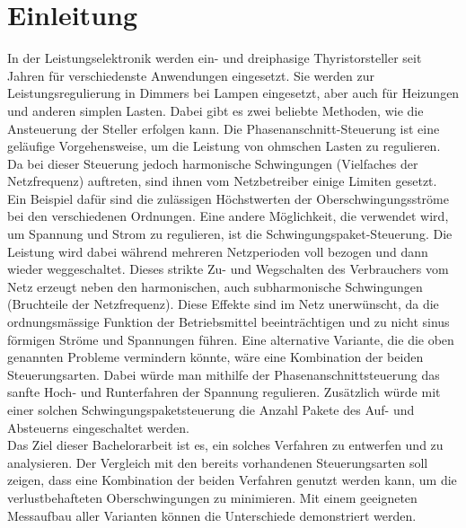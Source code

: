 \section{Einleitung}











In der Leistungselektronik werden ein- und dreiphasige Thyristorsteller seit Jahren für verschiedenste Anwendungen eingesetzt. Sie werden zur Leistungsregulierung in Dimmers bei Lampen eingesetzt, aber auch für Heizungen und anderen simplen Lasten. Dabei gibt es zwei beliebte Methoden, wie die Ansteuerung der Steller erfolgen kann. Die Phasenanschnitt-Steuerung ist eine geläufige Vorgehensweise, um die Leistung von ohmschen Lasten zu regulieren. Da bei dieser Steuerung jedoch harmonische Schwingungen (Vielfaches der Netzfrequenz) auftreten, sind ihnen vom Netzbetreiber einige Limiten gesetzt. Ein Beispiel dafür sind die zulässigen Höchstwerten der Oberschwingungsströme bei den verschiedenen Ordnungen. Eine andere Möglichkeit, die verwendet wird, um Spannung und Strom zu regulieren, ist die Schwingungspaket-Steuerung. Die Leistung wird dabei während mehreren Netzperioden voll bezogen und dann wieder weggeschaltet. Dieses strikte Zu- und Wegschalten des Verbrauchers vom Netz erzeugt neben den harmonischen, auch subharmonische Schwingungen (Bruchteile der Netzfrequenz). Diese Effekte sind im Netz unerwünscht, da die ordnungsmässige Funktion der Betriebsmittel beeinträchtigen und zu nicht sinus förmigen Ströme und Spannungen führen.
Eine alternative Variante, die die oben genannten Probleme vermindern könnte, wäre eine Kombination der beiden Steuerungsarten. Dabei würde man mithilfe der Phasenanschnittsteuerung das sanfte Hoch- und Runterfahren der Spannung regulieren. Zusätzlich würde mit einer solchen Schwingungspaketsteuerung die Anzahl Pakete des Auf- und Absteuerns eingeschaltet werden.\\
Das Ziel dieser Bachelorarbeit ist es, ein solches Verfahren zu entwerfen und zu analysieren. Der Vergleich mit den bereits vorhandenen Steuerungsarten soll zeigen, dass eine Kombination der beiden Verfahren genutzt werden kann, um die verlustbehafteten Oberschwingungen zu minimieren. Mit einem geeigneten Messaufbau aller Varianten können die Unterschiede demonstriert werden.\\
